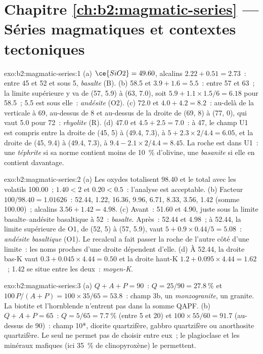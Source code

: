 \section*{Chapitre \ref{ch:b2:magmatic-series} --- Séries magmatiques et contextes tectoniques}

\begin{solution}{exo:b2:magmatic-series:1}
(a) $\ce{SiO2} = 49.60$, alcalins $2.22 + 0.51 = 2.73$~: entre 45 et 52 et sous 5,
\emph{basalte} (B). (b) 58.5 et $3.9 + 1.6 = 5.5$~: entre 57 et 63~; la limite supérieure y va
de (57, 5.9) à (63, 7.0), soit $5.9 + 1.1\times1.5/6 = 6.18$ pour 58.5~; 5.5 est sous elle~:
\emph{andésite} (O2). (c) 72.0 et $4.0 + 4.2 = 8.2$~: au-delà de la verticale à 69, au-dessus de 8
et au-dessus de la droite de (69, 8) à (77, 0), qui vaut 5.0 pour 72~: \emph{rhyolite} (R).
(d) 47.0 et $4.5 + 2.5 = 7.0$~: à 47, le champ U1 est compris entre la droite de (45, 5) à
(49.4, 7.3), à $5 + 2.3\times2/4.4 = 6.05$, et la droite de (45, 9.4) à (49.4, 7.3), à
$9.4 - 2.1\times2/4.4 = 8.45$. La roche est dans U1~: une \emph{téphrite} si sa norme contient
moins de \qty{10}{\percent} d'olivine, une
\emph{basanite} si elle en contient davantage.
\end{solution}

\begin{solution}{exo:b2:magmatic-series:2}
(a) Les oxydes totalisent 98.40 et le total avec les volatils 100.00~;
 $1.40 < 2$ et  $0.20 < 0.5$~: l'analyse est acceptable. (b) Facteur
$100/98.40 = 1.01626$~:  52.44,  1.22,  16.36,
 9.96,  6.71,  8.33,  3.56,  1.42
(somme 100.00)~; alcalins $3.56 + 1.42 = 4.98$. (c) Avant~: 51.60 et 4.90, juste sous la
limite basalte--andésite basaltique à 52~: \emph{basalte}. Après~: 52.44 et 4.98~; à
52.44, la limite supérieure de O1, de (52, 5) à (57, 5.9), vaut $5 + 0.9\times0.44/5
= 5.08$~: \emph{andésite basaltique} (O1). Le recalcul a fait passer la roche de l'autre côté
d'une limite~: les noms proches d'une droite dépendent d'elle. (d) À 52.44, la droite bas-K vaut $0.3 +
0.045\times4.44 = 0.50$ et la droite haut-K $1.2 + 0.095\times4.44 = 1.62$~; 1.42
se situe entre les deux~: \emph{moyen-K}.
\end{solution}

\begin{solution}{exo:b2:magmatic-series:3}
(a) $Q + A + P = 90$~: $Q = 25/90 = \qty{27.8}{\percent}$ et $100\,P/(A + P) =
100\times35/65 = 53.8$~: champ 3b, un \emph{monzogranite}, un granite. La biotite et
l'hornblende n'entrent pas dans la somme QAPF. (b) $Q + A + P = 65$~: $Q = 5/65 =
\qty{7.7}{\percent}$ (entre 5 et 20) et $100\times55/60 = 91.7$ (au-dessus de 90)~: champ
10*, diorite quartzifère, gabbro quartzifère ou anorthosite quartzifère. Le  seul ne
permet pas de choisir entre eux~; le plagioclase et les minéraux mafiques (ici
\qty{35}{\percent} de clinopyroxène) le permettent.
\end{solution}

